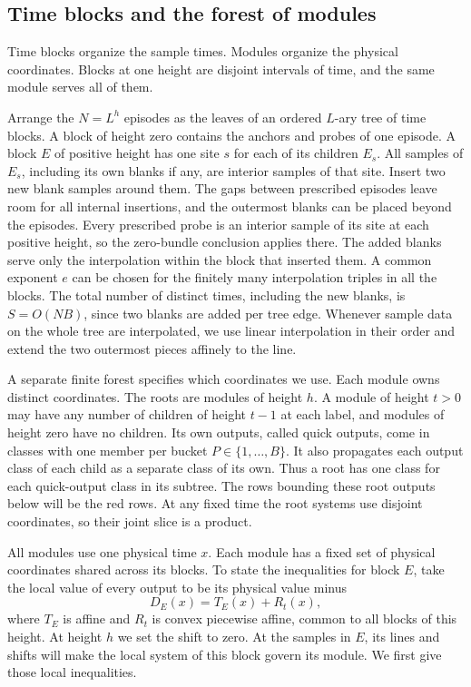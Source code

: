 \subsection{Time blocks and the forest of modules}
Time blocks organize the sample times. Modules organize the physical
coordinates. Blocks at one height are disjoint intervals of time,
and the same module serves all of them.

Arrange the $N=L^h$ episodes as the leaves of an ordered $L$-ary
tree of time blocks. A block of height zero contains the anchors
and probes of one episode. A block $E$ of positive height has one
site $s$ for each of its children $E_s$. All samples of $E_s$,
including its own blanks if any, are interior samples of that site.
Insert two new blank samples around them. The gaps between prescribed
episodes leave room for all internal insertions, and the outermost
blanks can be placed beyond the episodes. Every prescribed probe is an
interior sample of its site at each positive height, so the zero-bundle
conclusion applies there. The added blanks serve only the interpolation
within the block that inserted them. A common exponent \(e\) can be chosen
for the finitely many interpolation triples in all the blocks. The
total number of distinct times, including the new blanks, is
$S=O(NB)$, since two blanks are added per tree edge. Whenever sample
data on the whole tree are interpolated, we use linear interpolation in
their order and extend the two outermost pieces affinely to the line.

A separate finite forest specifies which coordinates we use. Each
module owns distinct coordinates. The roots are
modules of height $h$. A module of height $t>0$ may have any number of
children of height $t-1$ at each label, and modules of height zero
have no children. Its own outputs, called quick outputs, come in classes with one member
per bucket $P\in\{1,\ldots,B\}$. It also propagates each output class
of each child as a separate class of its own. Thus a root has one
class for each quick-output class in its subtree. The rows bounding
these root outputs below will be the red rows. At any fixed time the
root systems use disjoint coordinates, so their joint slice is a product.

All modules use one physical time $x$. Each module has a fixed set of
physical coordinates shared across its blocks. To state the inequalities
for block $E$, take the local value of every output to be its physical
value minus
\begin{equation}\label{eq:module-shift}
 D_E(x)=T_E(x)+R_t(x),
\end{equation}
where $T_E$ is affine and $R_t$ is convex piecewise affine, common
to all blocks of this height. At height $h$ we set the shift to zero.
At the samples in \(E\), its lines and shifts will make the local system
of this block govern its module. We first give those local inequalities.


